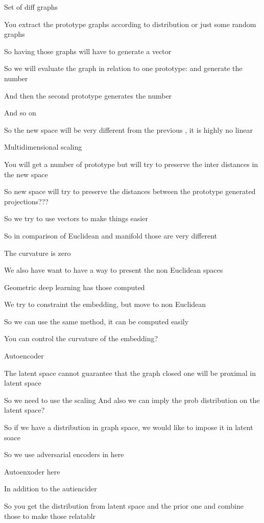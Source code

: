 \documentclass{article}
\begin{document}
Set of diff graphs

You extract the prototype graphs according to distribution or just some random graphs 

So having those graphs will have to generate a vector

So we will evaluate the graph in relation to one prototype: and generate the number

And then the second prototype generates the number

And so on 

So the new space will be very different from the previous , it is highly no linear


Multidimensional scaling

You will get a number of prototype but will try to preserve the inter distances in the new space



So new space will try to preserve the distances  between the prototype generated projections???

So we try to use vectors to make things easier



So in comparison of Euclidean and manifold those are very different 

The curvature is zero

We also have want to have a way to present the non Euclidean spaces 

Geometric deep learning has those computed

We try to constraint the embedding, but move to non Euclidean 

So we can use the same method, it can be computed easily 

You can control the curvature of the embedding?

Autoencoder

The latent space cannot guarantee that the graph closed one will be proximal in latent space

So we need to use the scaling
And also we can imply the prob distribution on the latent space?

So if we have a distribution in graph space, we would like to impose it in latent soace

So we use adversarial encoders in here

Autoenxoder here

In addition to the autiencider 

So you get the distribution from latent space and the prior one and combine those to make those relatablr
\end{document}
